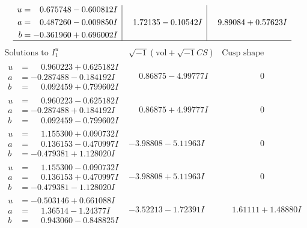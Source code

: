 \documentclass[1p]{elsarticle_modified}
\theoremstyle{definition}
\newcommand{\I}{\sqrt{-1}}
\begin{document}
$$\begin{array}{c|c|c}
\begin{aligned}
u &= \phantom{-}0.675748 - 0.600812 I \\
a &= \phantom{-}0.487260 - 0.009850 I \\
b &= -0.361960 + 0.696002 I\end{aligned}
 & \phantom{-}1.72135 - 0.10542 I & \phantom{-}9.89084 + 0.57623 I\\
 \hline 
 \end{array}$$\newpage$$\begin{array}{c|c|c}  
\text{Solutions to }I^u_{1}& \I (\text{vol} + \sqrt{-1}CS) & \text{Cusp shape}\\
 \hline 
\begin{aligned}
u &= \phantom{-}0.960223 + 0.625182 I \\
a &= -0.287488 - 0.184192 I \\
b &= \phantom{-}0.092459 + 0.799602 I\end{aligned}
 & \phantom{-}0.86875 - 4.99777 I & \phantom{-0.000000 } 0 \\ \hline\begin{aligned}
u &= \phantom{-}0.960223 - 0.625182 I \\
a &= -0.287488 + 0.184192 I \\
b &= \phantom{-}0.092459 - 0.799602 I\end{aligned}
 & \phantom{-}0.86875 + 4.99777 I & \phantom{-0.000000 } 0 \\ \hline\begin{aligned}
u &= \phantom{-}1.155300 + 0.090732 I \\
a &= \phantom{-}0.136153 - 0.470997 I \\
b &= -0.479381 + 1.128020 I\end{aligned}
 & -3.98808 - 5.11963 I & \phantom{-0.000000 } 0 \\ \hline\begin{aligned}
u &= \phantom{-}1.155300 - 0.090732 I \\
a &= \phantom{-}0.136153 + 0.470997 I \\
b &= -0.479381 - 1.128020 I\end{aligned}
 & -3.98808 + 5.11963 I & \phantom{-0.000000 } 0 \\ \hline\begin{aligned}
u &= -0.503146 + 0.661088 I \\
a &= \phantom{-}1.36514 - 1.24377 I \\
b &= \phantom{-}0.943060 - 0.848825 I\end{aligned}
 & -3.52213 - 1.72391 I & \phantom{-}1.61111 + 1.48880 I \\ \hline\begin{aligned}

\end{aligned}
\end{array}$$
\end{document}
